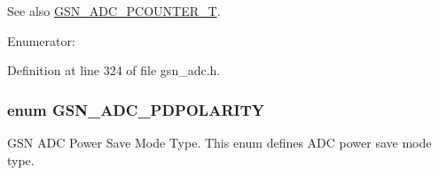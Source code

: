 \begin{DoxySeeAlso}{See also}
\hyperlink{a00643_ga61aa307a5df8fedd147de04bbdb9a36d}{GSN\_\-ADC\_\-PCOUNTER\_\-T}. 
\end{DoxySeeAlso}
\begin{Desc}
\item[Enumerator: ]\par
\begin{description}
\item[{\em 
\hypertarget{a00643_ggab6f216973f783f72673e41fefdcd0019aaeda64087d3a4710d38a483efcd80301}{
GSN\_\-ADC\_\-PCOUNTER\_\-DISABLE}
\label{a00643_ggab6f216973f783f72673e41fefdcd0019aaeda64087d3a4710d38a483efcd80301}
}]\item[{\em 
\hypertarget{a00643_ggab6f216973f783f72673e41fefdcd0019a6b3ae43107cef561827087593f54a1bf}{
GSN\_\-ADC\_\-PCOUNTER\_\-ENABLE}
\label{a00643_ggab6f216973f783f72673e41fefdcd0019a6b3ae43107cef561827087593f54a1bf}
}]\end{description}
\end{Desc}



Definition at line 324 of file gsn\_\-adc.h.

\hypertarget{a00643_ga16deea942d0f1d07a971516149233bb4}{
\subsubsection[{GSN\_\-ADC\_\-PDPOLARITY}]{\setlength{\rightskip}{0pt plus 5cm}enum {\bf GSN\_\-ADC\_\-PDPOLARITY}}}
\label{a00643_ga16deea942d0f1d07a971516149233bb4}


GSN ADC Power Save Mode Type. This enum defines ADC power save mode type. 

